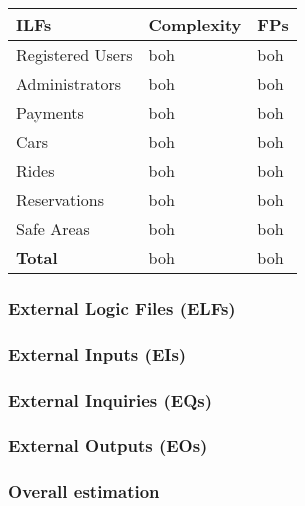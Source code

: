 \begin{tabular}{|l|l|l|}
	\hline
	\textbf{ILFs} 	& \textbf{Complexity} 	& \textbf{FPs} \\
	\hline
	Registered Users 	& boh 	& boh \\
	Administrators 	& boh 	& boh \\
	Payments 	& boh	& boh \\
	Cars 	& boh	& boh \\
	Rides 	& boh 	& boh \\
	Reservations 	& boh	& boh \\
	Safe Areas  	& boh	& boh \\
	\hline \hline
	\textbf{Total} 	& boh	& boh \\
	\hline
\end{tabular}

\subsubsection{External Logic Files (ELFs)}
\subsubsection{External Inputs (EIs)}
\subsubsection{External Inquiries (EQs)}
\subsubsection{External Outputs (EOs)}
\subsubsection{Overall estimation}